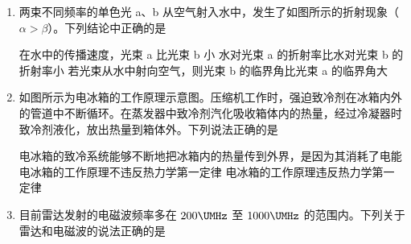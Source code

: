 \documentclass[\gkver]{gaokaozhenti}
\begin{document}
\begin{enumerate}
{列车过桥需要减速，是为了防止列车发生共振现象}
{列车运行的振动频率和列车的固有频率总是相等的}
{增加钢轨的长度有利于列车高速运行}


\item
两束不同频率的单色光 a、b 从空气射入水中，发生了如图所示的折射现象（$\alpha>\beta$）。下列结论中正确的是


{在水中的传播速度，光束 a 比光束 b 小}
{水对光束 a 的折射率比水对光束 b 的折射率小}
{若光束从水中射向空气，则光束 b 的临界角比光束 a 的临界角大}


\item
如图所示为电冰箱的工作原理示意图。压缩机工作时，强迫致冷剂在冰箱内外的管道中不断循环。在蒸发器中致冷剂汽化吸收箱体内的热量，经过冷凝器时致冷剂液化，放出热量到箱体外。下列说法正确的是

\onepicture[w=7.09cm]{}

{电冰箱的致冷系统能够不断地把冰箱内的热量传到外界，是因为其消耗了电能}
{电冰箱的工作原理不违反热力学第一定律}
{电冰箱的工作原理违反热力学第一定律}


\item
目前雷达发射的电磁波频率多在 $200\UMHz$ 至 $1000\UMHz$ 的范围内。下列关于雷达和电磁波的说法正确的是


\end{enumerate}
\end{document}
